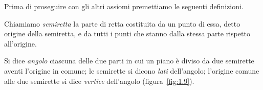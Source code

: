 \begin{inaccessibleblock}
 \begin{center} \end{center}
\end{inaccessibleblock}


Prima di proseguire con gli altri assiomi premettiamo le seguenti 
definizioni.
\begin{definizione}
Chiamiamo \emph{semiretta} la parte di retta costituita da un punto 
di essa, detto origine della semiretta, e da tutti i punti che stanno 
dalla stessa parte rispetto all'origine.
\end{definizione}

\begin{center}
 
\end{center}

\begin{definizione}
Si dice \emph{angolo} ciascuna delle due parti in cui un piano è 
diviso da due semirette aventi l'origine in comune; le semirette si 
dicono \emph{lati} dell'angolo; l'origine comune alle due semirette 
si dice \emph{vertice} dell'angolo (figura~\ref{fig:1.9}).
\end{definizione}
\begin{center}  \end{center}

